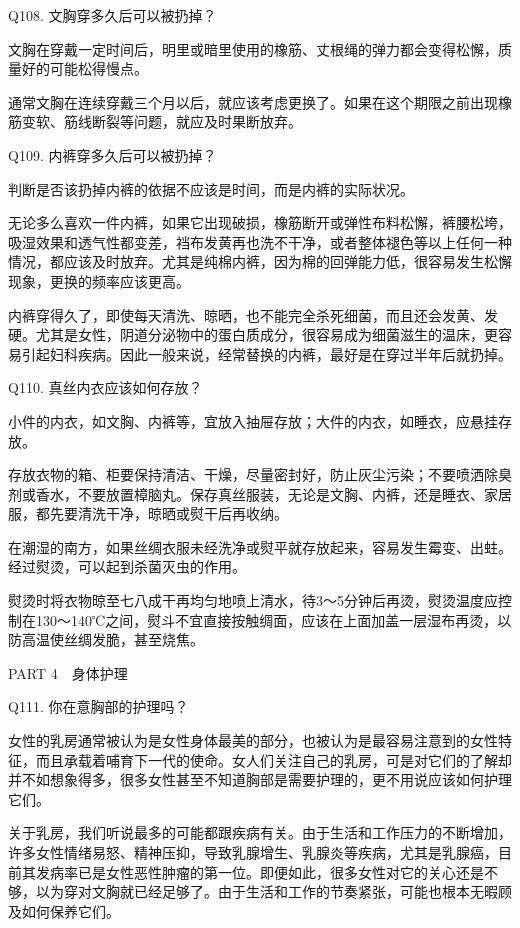 \documentclass[12pt,UTF8]{ctexbook}
\begin{document}
Q108. 文胸穿多久后可以被扔掉？


文胸在穿戴一定时间后，明里或暗里使用的橡筋、丈根绳的弹力都会变得松懈，质量好的可能松得慢点。

通常文胸在连续穿戴三个月以后，就应该考虑更换了。如果在这个期限之前出现橡筋变软、筋线断裂等问题，就应及时果断放弃。





Q109. 内裤穿多久后可以被扔掉？


判断是否该扔掉内裤的依据不应该是时间，而是内裤的实际状况。

无论多么喜欢一件内裤，如果它出现破损，橡筋断开或弹性布料松懈，裤腰松垮，吸湿效果和透气性都变差，裆布发黄再也洗不干净，或者整体褪色等以上任何一种情况，都应该及时放弃。尤其是纯棉内裤，因为棉的回弹能力低，很容易发生松懈现象，更换的频率应该更高。

内裤穿得久了，即使每天清洗、晾晒，也不能完全杀死细菌，而且还会发黄、发硬。尤其是女性，阴道分泌物中的蛋白质成分，很容易成为细菌滋生的温床，更容易引起妇科疾病。因此一般来说，经常替换的内裤，最好是在穿过半年后就扔掉。





Q110. 真丝内衣应该如何存放？


小件的内衣，如文胸、内裤等，宜放入抽屉存放；大件的内衣，如睡衣，应悬挂存放。

存放衣物的箱、柜要保持清洁、干燥，尽量密封好，防止灰尘污染；不要喷洒除臭剂或香水，不要放置樟脑丸。保存真丝服装，无论是文胸、内裤，还是睡衣、家居服，都先要清洗干净，晾晒或熨干后再收纳。

在潮湿的南方，如果丝绸衣服未经洗净或熨平就存放起来，容易发生霉变、出蛀。经过熨烫，可以起到杀菌灭虫的作用。

熨烫时将衣物晾至七八成干再均匀地喷上清水，待3～5分钟后再烫，熨烫温度应控制在130～140℃之间，熨斗不宜直接按触绸面，应该在上面加盖一层湿布再烫，以防高温使丝绸发脆，甚至烧焦。





PART 4　身体护理





Q111. 你在意胸部的护理吗？


女性的乳房通常被认为是女性身体最美的部分，也被认为是最容易注意到的女性特征，而且承载着哺育下一代的使命。女人们关注自己的乳房，可是对它们的了解却并不如想象得多，很多女性甚至不知道胸部是需要护理的，更不用说应该如何护理它们。

关于乳房，我们听说最多的可能都跟疾病有关。由于生活和工作压力的不断增加，许多女性情绪易怒、精神压抑，导致乳腺增生、乳腺炎等疾病，尤其是乳腺癌，目前其发病率已是女性恶性肿瘤的第一位。即便如此，很多女性对它的关心还是不够，以为穿对文胸就已经足够了。由于生活和工作的节奏紧张，可能也根本无暇顾及如何保养它们。
\end{document}
